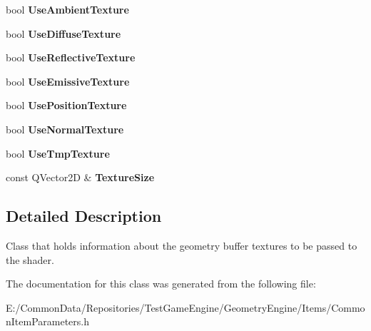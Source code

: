 \begin{DoxyCompactItemize}
bool {\bfseries Use\+Ambient\+Texture}
\item 
\mbox{\label{class_geometry_engine_1_1_g_buffer_texture_info_a6a2826cc837bacdd679af056d98d55b4}} 
bool {\bfseries Use\+Diffuse\+Texture}
\item 
\mbox{\label{class_geometry_engine_1_1_g_buffer_texture_info_a58dfdab3c9b2015639b6b6734f447817}} 
bool {\bfseries Use\+Reflective\+Texture}
\item 
\mbox{\label{class_geometry_engine_1_1_g_buffer_texture_info_a839a370b51863dcede4ade7aa0c3bcc3}} 
bool {\bfseries Use\+Emissive\+Texture}
\item 
\mbox{\label{class_geometry_engine_1_1_g_buffer_texture_info_af7857a51710f4de7a7b23708f1cef12c}} 
bool {\bfseries Use\+Position\+Texture}
\item 
\mbox{\label{class_geometry_engine_1_1_g_buffer_texture_info_aef8eef842f157dc28cb5aec17f6ef53f}} 
bool {\bfseries Use\+Normal\+Texture}
\item 
\mbox{\label{class_geometry_engine_1_1_g_buffer_texture_info_a1edf755a62c1455819a07b5b48bc9458}} 
bool {\bfseries Use\+Tmp\+Texture}
\item 
\mbox{\label{class_geometry_engine_1_1_g_buffer_texture_info_a3350a95b39b831c2d8196ff7f1239f33}} 
const Q\+Vector2D \& {\bfseries Texture\+Size}
\end{DoxyCompactItemize}


\subsection{Detailed Description}
Class that holds information about the geometry buffer textures to be passed to the shader. 

The documentation for this class was generated from the following file\+:\begin{DoxyCompactItemize}
\item 
E\+:/\+Common\+Data/\+Repositories/\+Test\+Game\+Engine/\+Geometry\+Engine/\+Items/Common\+Item\+Parameters.\+h\end{DoxyCompactItemize}
